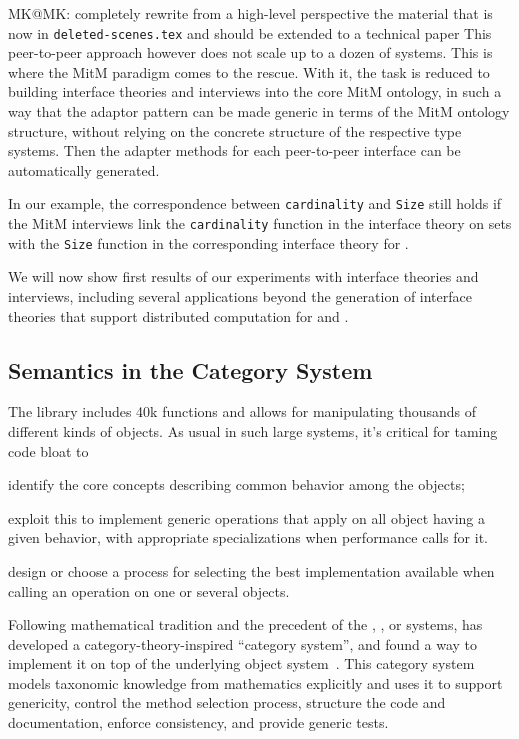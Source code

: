 \begin{newpart}{MK@MK: completely rewrite from a high-level perspective the material that
    is now in \texttt{deleted-scenes.tex} and should be extended to a technical paper}
This peer-to-peer approach however does not scale up to a dozen of
systems. This is where the MitM paradigm comes to the rescue. With it,
the task is reduced to building interface theories and interviews into
the core MitM ontology, in such a way that the adaptor pattern can be
made generic in terms of the MitM ontology structure, without relying
on the concrete structure of the respective type systems. Then the
adapter methods for each peer-to-peer interface can be automatically
generated.

In our example, the correspondence between \texttt{cardinality} and
\texttt{Size} still holds if the MitM interviews link the
\texttt{cardinality} function in the \Sage interface theory on sets
with the \texttt{Size} function in the corresponding interface theory
for \GAP.

We will now show first results of our experiments with interface
theories and interviews, including several applications beyond the
generation of interface theories that support distributed computation
for \Sage and \GAP.
\end{newpart}

\subsection{Semantics in the \Sage Category System}

The \Sage library includes 40k functions and allows for manipulating
thousands of different kinds of objects. As usual in such large
systems, it’s critical for taming code bloat to
\begin{inparaenum}[\em i\rm)]
\item identify the core concepts describing common behavior among the objects;
\item exploit this to implement generic operations that apply on all object having a given
  behavior, with appropriate specializations when performance calls for it.
\item design or choose a process for selecting the best implementation available when
  calling an operation on one or several objects.
\end{inparaenum}

Following mathematical tradition and the precedent of the \Axiom,
\Fricas, or \MuPAD systems, \Sage has developed a
category-theory-inspired ``category system'', and found a way to
implement it on top of the underlying \Python object
system~\cite{Sage.Categories}.
%
This category system models taxonomic knowledge from mathematics
explicitly and uses it to support genericity, control the method
selection process, structure the code and documentation, enforce
consistency, and provide generic tests.

